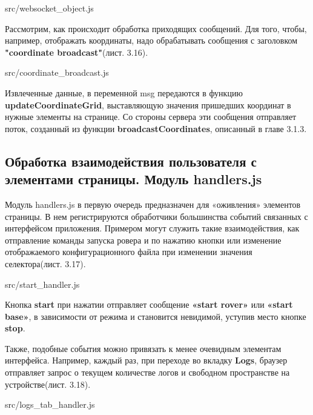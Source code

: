 
{src/websocket_object.js}

Рассмотрим, как происходит обработка приходящих сообщений. Для того, чтобы, например, отображать координаты, надо обрабатывать сообщения с заголовком \textbf{"coordinate broadcast"}(лист. 3.16).


{src/coordinate_broadcast.js}

Извлеченные данные, в переменной msg передаются в функцию \textbf{updateCoordinateGrid}, выставляющую значения пришедших координат в нужные элементы на странице. Со стороны сервера эти сообщения отправляет поток, созданный из функции \textbf{broadcastCoordinates}, описанный в главе 3.1.3.

\subsection{Обработка взаимодействия пользователя с элементами страницы. Модуль handlers.js} \label{subsect3_2_3}

Модуль handlers.js в первую очередь предназначен для «оживления» элементов страницы. В нем регистрируются обработчики большинства событий связанных с интерфейсом приложения. Примером могут служить такие взаимодействия, как отправление команды запуска ровера и по нажатию кнопки или изменение отображаемого конфигурационного файла при изменении значения селектора(лист. 3.17).


{src/start_handler.js}

Кнопка \textbf{start} при нажатии отправляет сообщение \textbf{«start rover»} или \textbf{«start base»}, в зависимости от режима и становится невидимой, уступив место кнопке \textbf{stop}.

Также, подобные события можно привязать к менее очевидным элементам интерфейса. Например, каждый раз, при переходе во вкладку \textbf{Logs}, браузер отправляет запрос о текущем количестве логов и свободном пространстве на устройстве(лист. 3.18).


{src/logs_tab_handler.js}

